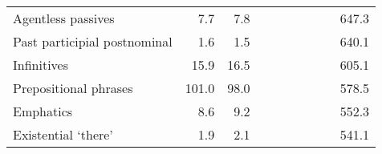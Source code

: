 \begin{table}[!t]
\begin{tabular*}{\linewidth}{@{\extracolsep{\fill}}lrrrrrrrrr}
Agentless passives & 7.7 & 7.8 & {\cellcolor[HTML]{F4A582}{\textcolor[HTML]{000000}{51\%}}} & {\cellcolor[HTML]{F4A582}{\textcolor[HTML]{000000}{53\%}}} & {\cellcolor[HTML]{F7F7F7}{\textcolor[HTML]{000000}{96\%}}} & {\cellcolor[HTML]{FDDBC7}{\textcolor[HTML]{000000}{89\%}}} & {\cellcolor[HTML]{F7F7F7}{\textcolor[HTML]{000000}{101\%}}} & {\cellcolor[HTML]{F7F7F7}{\textcolor[HTML]{000000}{98\%}}} & 647.3 \\ 
Past participial postnominal & 1.6 & 1.5 & {\cellcolor[HTML]{4393C3}{\textcolor[HTML]{FFFFFF}{257\%}}} & {\cellcolor[HTML]{4393C3}{\textcolor[HTML]{FFFFFF}{235\%}}} & {\cellcolor[HTML]{FDDBC7}{\textcolor[HTML]{000000}{75\%}}} & {\cellcolor[HTML]{FDDBC7}{\textcolor[HTML]{000000}{75\%}}} & {\cellcolor[HTML]{D1E5F0}{\textcolor[HTML]{000000}{129\%}}} & {\cellcolor[HTML]{D1E5F0}{\textcolor[HTML]{000000}{131\%}}} & 640.1 \\ 
Infinitives & 15.9 & 16.5 & {\cellcolor[HTML]{FDDBC7}{\textcolor[HTML]{000000}{87\%}}} & {\cellcolor[HTML]{FDDBC7}{\textcolor[HTML]{000000}{83\%}}} & {\cellcolor[HTML]{92C5DE}{\textcolor[HTML]{000000}{140\%}}} & {\cellcolor[HTML]{D1E5F0}{\textcolor[HTML]{000000}{132\%}}} & {\cellcolor[HTML]{D1E5F0}{\textcolor[HTML]{000000}{120\%}}} & {\cellcolor[HTML]{D1E5F0}{\textcolor[HTML]{000000}{113\%}}} & 605.1 \\ 
Prepositional phrases & 101.0 & 98.0 & {\cellcolor[HTML]{D1E5F0}{\textcolor[HTML]{000000}{118\%}}} & {\cellcolor[HTML]{D1E5F0}{\textcolor[HTML]{000000}{118\%}}} & {\cellcolor[HTML]{F7F7F7}{\textcolor[HTML]{000000}{100\%}}} & {\cellcolor[HTML]{F7F7F7}{\textcolor[HTML]{000000}{100\%}}} & {\cellcolor[HTML]{FDDBC7}{\textcolor[HTML]{000000}{87\%}}} & {\cellcolor[HTML]{F7F7F7}{\textcolor[HTML]{000000}{90\%}}} & 578.5 \\ 
Emphatics & 8.6 & 9.2 & {\cellcolor[HTML]{F4A582}{\textcolor[HTML]{000000}{75\%}}} & {\cellcolor[HTML]{F4A582}{\textcolor[HTML]{000000}{68\%}}} & {\cellcolor[HTML]{F7F7F7}{\textcolor[HTML]{000000}{97\%}}} & {\cellcolor[HTML]{F7F7F7}{\textcolor[HTML]{000000}{98\%}}} & {\cellcolor[HTML]{FDDBC7}{\textcolor[HTML]{000000}{76\%}}} & {\cellcolor[HTML]{F4A582}{\textcolor[HTML]{000000}{75\%}}} & 552.3 \\ 
Existential ‘there’ & 1.9 & 2.1 & {\cellcolor[HTML]{F4A582}{\textcolor[HTML]{000000}{59\%}}} & {\cellcolor[HTML]{F4A582}{\textcolor[HTML]{000000}{71\%}}} & {\cellcolor[HTML]{D6604D}{\textcolor[HTML]{FFFFFF}{42\%}}} & {\cellcolor[HTML]{D6604D}{\textcolor[HTML]{FFFFFF}{42\%}}} & {\cellcolor[HTML]{F7F7F7}{\textcolor[HTML]{000000}{108\%}}} & {\cellcolor[HTML]{F7F7F7}{\textcolor[HTML]{000000}{109\%}}} & 541.1 \\ 

\end{tabular*}
\end{table}
